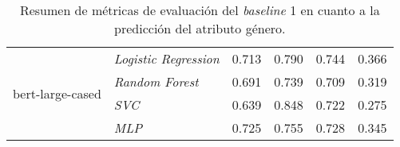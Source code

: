 \begin{table}[htpb]
{\begin{tabular}{llcccc}
        \midrule\midrule
        \multirow{4}{*}{bert-large-cased}   & \emph{Logistic Regression}  & 0.713 & 0.790 & 0.744 & 0.366\\
        \cmidrule{2-6}
                                            & \emph{Random Forest}        & 0.691 & 0.739 & 0.709 & 0.319\\
        \cmidrule{2-6}
                                            & \emph{SVC}                  & 0.639 & 0.848 & 0.722 & 0.275\\
        \cmidrule{2-6}
                                            & \emph{MLP}                  & 0.725 & 0.755 & 0.728 & 0.345\\
        \bottomrule
        \end{tabular}}
    \caption{Resumen de m\'etricas de evaluaci\'on del \emph{baseline} 1 en cuanto a la predicci\'on del atributo g\'enero.}
    \label{table:eval_baseline1_gender}
\end{table}

